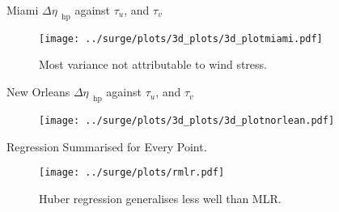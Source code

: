 \begin{frame}{Miami $\Delta\eta_{\;\;\mathrm{hp}}$ against $\tau_u$, and $\tau_v$}
\vspace{-30pt}
\hspace{-30pt}
 \begin{minipage}{1.1\textwidth}

\begin{figure}[htb!]
    \centering
   \hspace{-40pt} \texttt{[image: ../surge/plots/3d\_plots/3d\_plotmiami.pdf]}
    \vspace{-15pt}
    \caption{Most variance not attributable to wind stress.}
    \label{fig:A}
\end{figure}
\end{minipage}
\end{frame}


\begin{frame}{New Orleans $\Delta\eta_{\;\;\mathrm{hp}}$ against $\tau_u$, and $\tau_v$}
\vspace{-30pt}
\hspace{-30pt}
 \begin{minipage}{1.1\textwidth}
\begin{figure}[htb!]
    \centering
   \hspace{-40pt} \texttt{[image: ../surge/plots/3d\_plots/3d\_plotnorlean.pdf]}
    \vspace{-15pt}
    \label{fig:A}
\end{figure}
\end{minipage}
\end{frame}


\begin{frame}{Regression Summarised for Every Point.}
\vspace{-30pt}
\hspace{-30pt}
 \begin{minipage}{1.1\textwidth}
\begin{figure}[htb!]
    \centering
   \hspace{-40pt} \texttt{[image: ../surge/plots/rmlr.pdf]}
    \vspace{-15pt}
   \caption{Huber regression generalises less well than MLR.}
    \label{fig:A}
\end{figure}
\end{minipage}
\end{frame}


